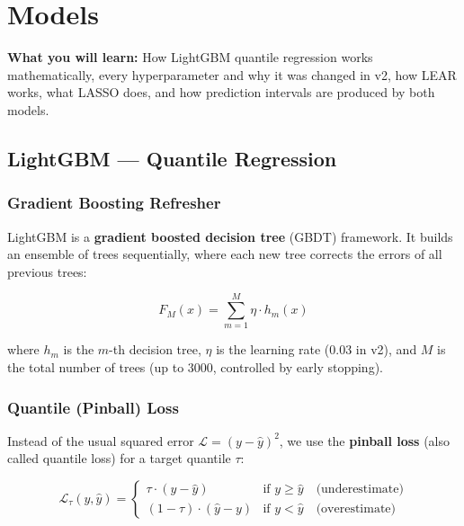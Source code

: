\documentclass[12pt, a4paper, oneside]{memoir}
\begin{document}
\chapter{Models}\label{ch:models}

\begin{chapterintro}
\sffamily\small\textbf{What you will learn:} How LightGBM quantile regression works
mathematically, every hyperparameter and why it was changed in v2, how LEAR works,
what LASSO does, and how prediction intervals are produced by both models.
\end{chapterintro}

\section{LightGBM --- Quantile Regression}

\subsection{Gradient Boosting Refresher}

LightGBM is a \textbf{gradient boosted decision tree} (GBDT) framework. It builds an
ensemble of trees sequentially, where each new tree corrects the errors of all previous trees:

\[
  F_M(x) = \sum_{m=1}^{M} \eta \cdot h_m(x)
\]

where $h_m$ is the $m$-th decision tree, $\eta$ is the learning rate (0.03 in v2),
and $M$ is the total number of trees (up to 3000, controlled by early stopping).

\subsection{Quantile (Pinball) Loss}

Instead of the usual squared error $\mathcal{L} = (y - \hat{y})^2$, we use the
\textbf{pinball loss} (also called quantile loss) for a target quantile $\tau$:

\begin{keyidea}
\[
  \mathcal{L}_\tau(y, \hat{y}) = \begin{cases}
    \tau \cdot (y - \hat{y})       & \text{if } y \geq \hat{y} \quad \text{(underestimate)} \\
    (1-\tau) \cdot (\hat{y} - y)  & \text{if } y < \hat{y}  \quad \text{(overestimate)}
  \end{cases}
\]
\end{keyidea}
\end{document}
